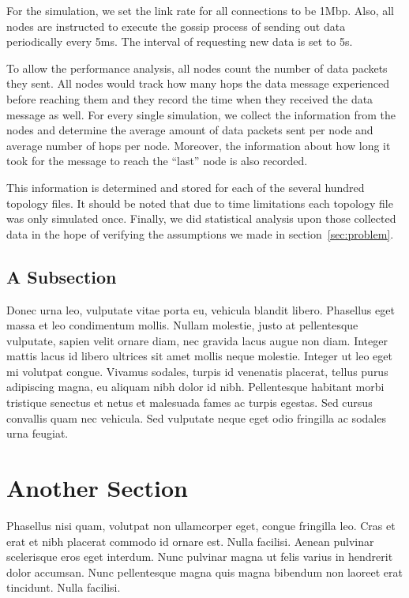 For the simulation, we set the link rate for all connections to be 1Mbp. Also, all nodes are instructed to execute the gossip process of sending out data periodically every 5ms. The interval of requesting new data is set to 5s.

To allow the performance analysis, all nodes count the number of data packets they sent. All nodes would track how many hops the data message experienced before reaching them and they record the time when they received the data message as well. For every single simulation, we collect the information from the nodes and determine the average amount of data packets sent per node and average number of hops per node. Moreover, the information about how long it took for the message to reach the ``last'' node is also recorded.

This information is determined and stored for each of the several hundred topology files. It should be noted that due to time limitations each topology file was only simulated once. Finally, we did statistical analysis upon those collected data in the hope of verifying the assumptions we made in section~\ref{sec:problem}.






\subsection{A Subsection}

Donec urna leo, vulputate vitae porta eu, vehicula blandit libero. Phasellus eget massa et leo condimentum mollis. Nullam molestie, justo at pellentesque vulputate, sapien velit ornare diam, nec gravida lacus augue non diam. Integer mattis lacus id libero ultrices sit amet mollis neque molestie. Integer ut leo eget mi volutpat congue. Vivamus sodales, turpis id venenatis placerat, tellus purus adipiscing magna, eu aliquam nibh dolor id nibh. Pellentesque habitant morbi tristique senectus et netus et malesuada fames ac turpis egestas. Sed cursus convallis quam nec vehicula. Sed vulputate neque eget odio fringilla ac sodales urna feugiat.

\section{Another Section}

Phasellus nisi quam, volutpat non ullamcorper eget, congue fringilla leo. Cras et erat et nibh placerat commodo id ornare est. Nulla facilisi. Aenean pulvinar scelerisque eros eget interdum. Nunc pulvinar magna ut felis varius in hendrerit dolor accumsan. Nunc pellentesque magna quis magna bibendum non laoreet erat tincidunt. Nulla facilisi.

